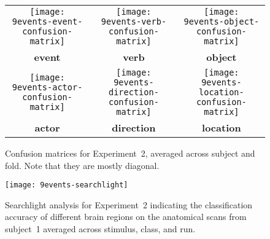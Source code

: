 \begin{figure}
  \begin{center}
    \begin{tabular}{ccc}
      \texttt{[image: 9events-event-confusion-matrix]}&
      \texttt{[image: 9events-verb-confusion-matrix]}&
      \texttt{[image: 9events-object-confusion-matrix]}\\
      \textbf{event}&\textbf{verb}&\textbf{object}\\
      \texttt{[image: 9events-actor-confusion-matrix]}&
      \texttt{[image: 9events-direction-confusion-matrix]}&
      \texttt{[image: 9events-location-confusion-matrix]}\\
      \textbf{actor}&\textbf{direction}&\textbf{location}
    \end{tabular}
  \end{center}
  \caption{Confusion matrices for Experiment~2, averaged across subject and fold.
    Note that they are mostly diagonal.}
  \label{fig:9events-results3}
\end{figure}

\begin{figure}
  \begin{center}
    \texttt{[image: 9events-searchlight]}
  \end{center}
  \caption{Searchlight analysis for Experiment~2 indicating the classification
    accuracy of different brain regions on the anatomical scans from subject~1
    averaged across stimulus, class, and run.}
  \label{fig:9events-searchlight}
\end{figure}
